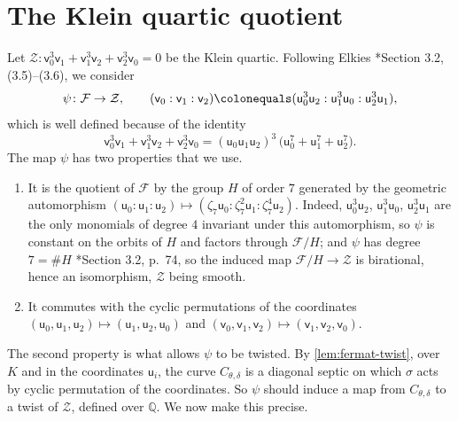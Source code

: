 \documentclass[12pt]{amsart}
\newcommand{\Q}{\mathbb{Q}}
\newcommand{\calF}{{\mathcal F}}
\newcommand{\calZ}{{\mathcal Z}}
\newcommand{\sfu}{\mathsf{u}}
\newcommand{\sfv}{\mathsf{v}}
\numberwithin{equation}{section}
\theoremstyle{definition}
\begin{document}
\section{The Klein quartic quotient}
\label{sec:klein}

Let $\calZ \colon \sfv_0^3\sfv_1 + \sfv_1^3\sfv_2 + \sfv_2^3\sfv_0 = 0$ be the
Klein quartic. Following Elkies \cite{Elkies-99}*{Section 3.2, (3.5)--(3.6)},
we consider
\begin{equation}
  \label{eq:psi}
  \psi \colon \calF \to \calZ, \qquad (\sfv_0:\sfv_1:\sfv_2) \colonequals (\sfu_0^3\sfu_2
  : \sfu_1^3\sfu_0 : \sfu_2^3\sfu_1),
\end{equation}
which is well defined because of the identity
\begin{equation}
  \label{eq:elkies-identity}
  \sfv_0^3\sfv_1 + \sfv_1^3\sfv_2 + \sfv_2^3\sfv_0
  = (\sfu_0\sfu_1\sfu_2)^{3}\,\bigl(\sfu_0^7 + \sfu_1^7 + \sfu_2^7\bigr).
\end{equation}
The map $\psi$ has two properties that we use.
\begin{enumerate}
\item It is the quotient of $\calF$ by the group $H$ of order $7$ generated by
  the geometric automorphism
  $(\sfu_0:\sfu_1:\sfu_2) \mapsto (\zeta_7\sfu_0 : \zeta_7^{2}\sfu_1 :
  \zeta_7^{4}\sfu_2)$. Indeed, $\sfu_0^3\sfu_2$, $\sfu_1^3\sfu_0$,
  $\sfu_2^3\sfu_1$ are the only monomials of degree $4$ invariant under this
  automorphism, so $\psi$ is constant on the orbits of $H$ and factors through
  $\calF/H$; and $\psi$ has degree $7 = \#H$ \cite{Elkies-99}*{Section 3.2, p.~74},
  so the induced map $\calF/H \to \calZ$ is birational, hence an isomorphism,
  $\calZ$ being smooth.
\item It commutes with the cyclic permutations of the coordinates
  $(\sfu_0,\sfu_1,\sfu_2) \mapsto (\sfu_1,\sfu_2,\sfu_0)$ and
  $(\sfv_0,\sfv_1,\sfv_2) \mapsto (\sfv_1,\sfv_2,\sfv_0)$.
\end{enumerate}
The second property is what allows $\psi$ to be twisted. By
\cref{lem:fermat-twist}, over $K$ and in the coordinates $\sfu_i$, the curve $C_{\theta,\delta}$ is a diagonal septic on which
$\sigma$ acts by cyclic permutation of the coordinates. So $\psi$ should induce
a map from $C_{\theta,\delta}$ to a twist of $\calZ$, defined over $\Q$. We now
make this precise.
\end{document}

